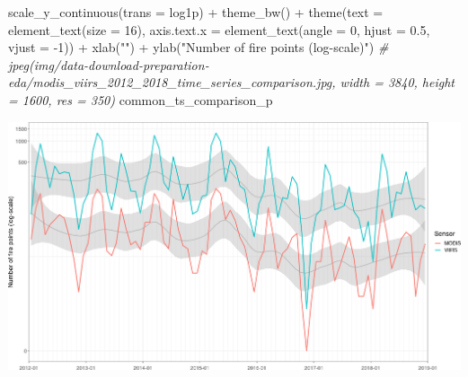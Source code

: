 \documentclass[10pt,landscape,a3paper]{article}
\newenvironment{Shaded}{\begin{snugshade}}{\end{snugshade}}
\newcommand{\AttributeTok}[1]{\textcolor[rgb]{0.77,0.63,0.00}{#1}}
\newcommand{\CommentTok}[1]{\textcolor[rgb]{0.56,0.35,0.01}{\textit{#1}}}
\newcommand{\DecValTok}[1]{\textcolor[rgb]{0.00,0.00,0.81}{#1}}
\newcommand{\FloatTok}[1]{\textcolor[rgb]{0.00,0.00,0.81}{#1}}
\newcommand{\FunctionTok}[1]{\textcolor[rgb]{0.00,0.00,0.00}{#1}}
\newcommand{\NormalTok}[1]{#1}
\newcommand{\SpecialCharTok}[1]{\textcolor[rgb]{0.00,0.00,0.00}{#1}}
\newcommand{\StringTok}[1]{\textcolor[rgb]{0.31,0.60,0.02}{#1}}
\begin{document}
\begin{Shaded}
\begin{Highlighting}[]
  \FunctionTok{scale\_y\_continuous}\NormalTok{(}\AttributeTok{trans =} \StringTok{\textquotesingle{}log1p\textquotesingle{}}\NormalTok{) }\SpecialCharTok{+}
  \FunctionTok{theme\_bw}\NormalTok{() }\SpecialCharTok{+}
  \FunctionTok{theme}\NormalTok{(}\AttributeTok{text =} \FunctionTok{element\_text}\NormalTok{(}\AttributeTok{size =} \DecValTok{16}\NormalTok{), }\AttributeTok{axis.text.x =} \FunctionTok{element\_text}\NormalTok{(}\AttributeTok{angle =} \DecValTok{0}\NormalTok{, }\AttributeTok{hjust =} \FloatTok{0.5}\NormalTok{, }\AttributeTok{vjust =} \SpecialCharTok{{-}}\DecValTok{1}\NormalTok{)) }\SpecialCharTok{+}
  \FunctionTok{xlab}\NormalTok{(}\StringTok{""}\NormalTok{) }\SpecialCharTok{+} \FunctionTok{ylab}\NormalTok{(}\StringTok{"Number of fire points (log{-}scale)"}\NormalTok{)}
\CommentTok{\# jpeg(\textquotesingle{}img/data{-}download{-}preparation{-}eda/modis\_viirs\_2012\_2018\_time\_series\_comparison.jpg\textquotesingle{}, width = 3840, height = 1600, res = 350)}
\NormalTok{common\_ts\_comparison\_p}
\end{Highlighting}
\end{Shaded}

\begin{center}\includegraphics[width=0.75\linewidth]{img/data-download-preparation-eda/unnamed-chunk-1-5} \end{center}
\end{document}
